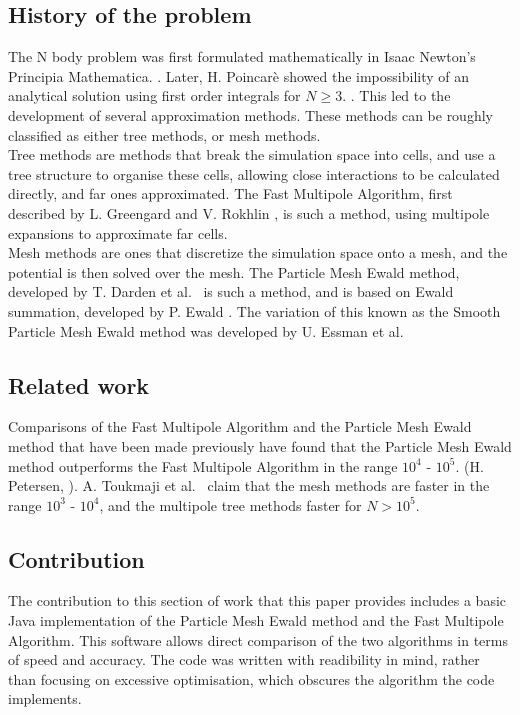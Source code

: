 \documentclass[pdftex,twoside,a4paper]{report}
\newcommand{\pmem}{Particle Mesh Ewald method}
\newcommand{\fma}{Fast Multipole Algorithm}
\begin{document}
    \subsection{History of the problem}
    The N body problem was first formulated mathematically in Isaac Newton's Principia Mathematica. \cite{principia}. Later, H. Poincar\`{e} showed the impossibility of an analytical solution using first order integrals for $N \geq 3$. \cite{poincare}. This led to the development of several approximation methods. These methods can be roughly classified as either tree methods, or mesh methods.\\
    
    Tree methods are methods that break the simulation space into cells, and use a tree structure to organise these cells, allowing close interactions to be calculated directly, and far ones approximated. The \fma{}, first described by L. Greengard and V. Rokhlin \cite{greengard:315}, is such a method, using multipole expansions to approximate far cells.\\
    
    Mesh methods are ones that discretize the simulation space onto a mesh, and the potential is then solved over the mesh. The \pmem{}, developed by T. Darden et al.\ \cite{darden:10089} is such a method, and is based on Ewald summation, developed by P. Ewald \cite{ewald}. The variation of this known as the Smooth \pmem{} was developed by U. Essman et al.\ \cite{essmann:8577}\\
    \subsection{Related work}
    Comparisons of the \fma{} and the \pmem{} that have been made previously have found that the \pmem{} outperforms the \fma{} in the range $10^4$ - $10^5$. (H. Petersen, \cite{petersen:3668}). A. Toukmaji et al.\ \cite{toukmaji:73} claim that the mesh methods are faster in the range $10^3$ - $10^4$, and the multipole tree methods faster for $N > 10^5$.
    \subsection{Contribution}
    The contribution to this section of work that this paper provides includes a basic Java implementation of the \pmem{} and the \fma{}. This software allows direct comparison of the two algorithms in terms of speed and accuracy. The code was written with readibility in mind, rather than focusing on excessive optimisation, which obscures the algorithm the code implements.
    
\end{document}
